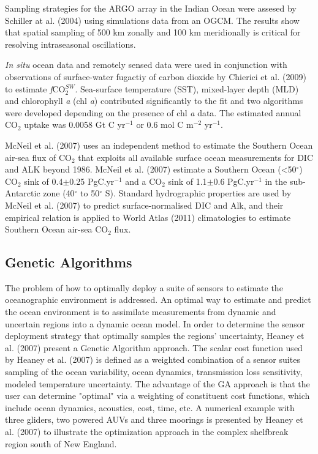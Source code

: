 \documentclass[11pt, a4paper]{article}
\numberwithin{figure}{section}
\numberwithin{table}{section}
\begin{document}

Sampling strategies for the ARGO array in the Indian Ocean were assesed by 
Schiller at al. (2004) using simulations data from an OGCM. The results show 
that spatial sampling of 500 km zonally and 100 km meridionally is critical for 
resolving intraseasonal oscillations.


\emph{In situ} ocean data and remotely sensed data were used in conjunction 
with observations of surface-water fugactiy of carbon dioxide by 
Chierici et al. (2009) to estimate \emph{f}CO$_{2}^{SW}$.
Sea-surface temperature (SST), mixed-layer depth (MLD) and chlorophyll \emph{a} 
(chl \emph{a}) contributed significantly to the fit and two algorithms were 
developed depending on the presence of chl \emph{a} data. 
The estimated annual 
CO$_2$ uptake was 0.0058 Gt C yr$^{-1}$ or 0.6 mol C m$^{-2}$ yr$^{-1}$. 


McNeil et al. (2007) uses an independent method to estimate the Southern Ocean 
air-sea flux of CO$_2$ that exploits all available surface ocean measurements 
for DIC and ALK beyond 1986. 
McNeil et al. (2007) estimate a Southern Ocean (\textless 50$^{\circ}$) CO$_2$ sink of 
0.4$\pm$0.25 PgC.yr$^{-1}$ and a CO$_2$ sink of 1.1$\pm$0.6 PgC.yr$^{-1}$ in the 
sub-Antarctic zone (40$^\circ$ to 50$^\circ$ S).
Standard hydrographic properties are used by McNeil et al. (2007) to predict 
surface-normalised DIC and Alk, and their empirical relation is applied to World 
Atlas (2011) climatologies to estimate Southern Ocean air-sea CO$_2$ flux.

\subsection{Genetic Algorithms}

The problem of how to optimally deploy a suite of sensors
to estimate the oceanographic environment is addressed.
An optimal way to estimate and predict the ocean environment is to assimilate
measurements from dynamic and uncertain regions into a dynamic ocean model. 
In order to determine the sensor deployment strategy that optimally samples the 
regions' uncertainty, Heaney et al. (2007) present a Genetic Algorithm
approach. The scalar cost function used by Heaney et al. (2007) is defined as a weighted 
combination of a sensor suites sampling of the ocean variability, ocean 
dynamics, transmission loss sensitivity, modeled temperature uncertainty. 
The advantage of the GA approach is that the user can determine "optimal" via 
a weighting of constituent cost functions, which include ocean dynamics, 
acoustics, cost, time, etc. A numerical example with three gliders, two 
powered AUVs and three moorings is presented by Heaney et al. (2007) 
to illustrate the optimization 
approach in the complex shelfbreak region south of New England. 
\end{document}
